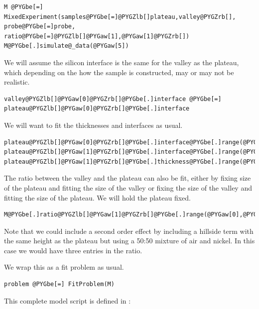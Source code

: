 \documentclass[letterpaper,10pt,english]{sphinxmanual}
\begin{document}
\begin{Verbatim}[commandchars=@\[\]]
M @PYGbe[=] MixedExperiment(samples@PYGbe[=]@PYGZlb[]plateau,valley@PYGZrb[], probe@PYGbe[=]probe, ratio@PYGbe[=]@PYGZlb[]@PYGaw[1],@PYGaw[1]@PYGZrb[])
M@PYGbe[.]simulate@_data(@PYGaw[5])
\end{Verbatim}

We will assume the silicon interface is the same for the valley as the
plateau, which depending on the how the sample is constructed, may or
may not be realistic.

\begin{Verbatim}[commandchars=@\[\]]
valley@PYGZlb[]@PYGaw[0]@PYGZrb[]@PYGbe[.]interface @PYGbe[=] plateau@PYGZlb[]@PYGaw[0]@PYGZrb[]@PYGbe[.]interface
\end{Verbatim}

We will want to fit the thicknesses and interfaces as usual.

\begin{Verbatim}[commandchars=@\[\]]
plateau@PYGZlb[]@PYGaw[0]@PYGZrb[]@PYGbe[.]interface@PYGbe[.]range(@PYGaw[0],@PYGaw[200])
plateau@PYGZlb[]@PYGaw[1]@PYGZrb[]@PYGbe[.]interface@PYGbe[.]range(@PYGaw[0],@PYGaw[200])
plateau@PYGZlb[]@PYGaw[1]@PYGZrb[]@PYGbe[.]thickness@PYGbe[.]range(@PYGaw[200],@PYGaw[1800])
\end{Verbatim}

The ratio between the valley and the plateau can also be fit, either
by fixing size of the plateau and fitting the size of the valley or
fixing the size of the valley and fitting the size of the plateau.  We
will hold the plateau fixed.

\begin{Verbatim}[commandchars=@\[\]]
M@PYGbe[.]ratio@PYGZlb[]@PYGaw[1]@PYGZrb[]@PYGbe[.]range(@PYGaw[0],@PYGaw[5])
\end{Verbatim}

Note that we could include a second order effect by including a
hillside term with the same height as the plateau but using a
50:50 mixture of air and nickel.  In this case we would have three
entries in the ratio.

We wrap this as a fit problem as usual.

\begin{Verbatim}[commandchars=@\[\]]
problem @PYGbe[=] FitProblem(M)
\end{Verbatim}

This complete model script is defined in
:
\end{document}
